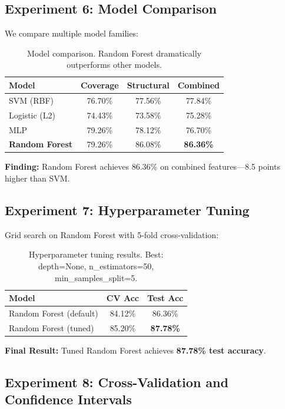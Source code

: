 \documentclass[11pt]{article}
\begin{document}
\subsection{Experiment 6: Model Comparison}

We compare multiple model families:

\begin{table}[h]
\centering
\small
\begin{tabular}{lccc}
\toprule
\textbf{Model} & \textbf{Coverage} & \textbf{Structural} & \textbf{Combined} \\
\midrule
SVM (RBF) & 76.70\% & 77.56\% & 77.84\% \\
Logistic (L2) & 74.43\% & 73.58\% & 75.28\% \\
MLP & 79.26\% & 78.12\% & 76.70\% \\
\textbf{Random Forest} & 79.26\% & 86.08\% & \textbf{86.36\%} \\
\bottomrule
\end{tabular}
\caption{Model comparison. Random Forest dramatically outperforms other models.}
\label{tab:models}
\end{table}

\textbf{Finding:} Random Forest achieves 86.36\% on combined features---8.5 points higher than SVM.

\subsection{Experiment 7: Hyperparameter Tuning}

Grid search on Random Forest with 5-fold cross-validation:

\begin{table}[h]
\centering
\small
\begin{tabular}{lcc}
\toprule
\textbf{Model} & \textbf{CV Acc} & \textbf{Test Acc} \\
\midrule
Random Forest (default) & 84.12\% & 86.36\% \\
Random Forest (tuned) & 85.20\% & \textbf{87.78\%} \\
\bottomrule
\end{tabular}
\caption{Hyperparameter tuning results. Best: depth=None, n\_estimators=50, min\_samples\_split=5.}
\label{tab:tuning}
\end{table}

\textbf{Final Result:} Tuned Random Forest achieves \textbf{87.78\% test accuracy}.

\subsection{Experiment 8: Cross-Validation and Confidence Intervals}
\end{document}
